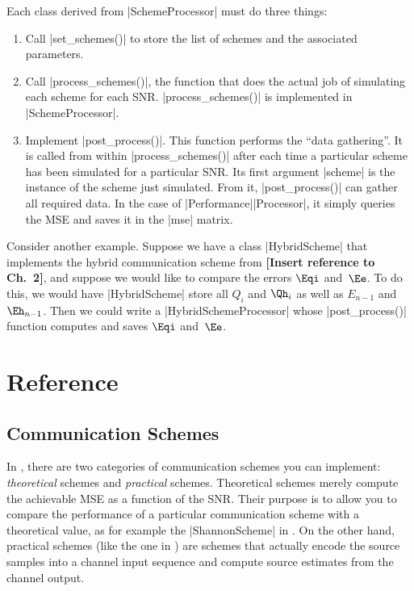 Each class derived from |SchemeProcessor| must do three things:
\begin{enumerate}
  \item Call |set_schemes()| to store the list of schemes and the associated
    parameters.

  \item Call |process_schemes()|, the function that does the actual job of
    simulating each scheme for each SNR. |process_schemes()| is implemented in
    |SchemeProcessor|. 

  \item Implement |post_process()|. This function performs the ``data
    gathering''. It is called from within |process_schemes()| after each time a
    particular scheme has been simulated for a particular SNR. Its first
    argument |scheme| is the instance of the scheme just simulated. From it,
    |post_process()| can gather all required data.  In the case of
    |Performance|\-|Processor|, it simply queries the MSE and saves it in the
    |mse| matrix.
\end{enumerate}


Consider another example. Suppose we have a class |HybridScheme| that implements
the hybrid communication scheme from \textbf{[Insert reference to Ch.~2]}, and
suppose we would like to compare the errors $\Eqi$ and~$\Ee$. To do this, we would have |HybridScheme| store all $Q_i$ and
$\Qh_i$ as well as $E_{n-1}$ and $\Eh_{n-1}$. Then we could write a
|HybridSchemeProcessor| whose |post_process()| function computes and saves
$\Eqi$ and~$\Ee$. 


\section{Reference}

\subsection{Communication Schemes}

In \jscsim, there are two categories of communication schemes you can implement:
\emph{theoretical} schemes and \emph{practical} schemes. Theoretical schemes
merely compute the achievable MSE as a function of the SNR. Their purpose is to
allow you to compare the performance of a particular communication scheme with a
theoretical value, as for example the |ShannonScheme| in . 
On the other hand, practical schemes (like the one in ) are
schemes that actually encode the source samples into a channel input sequence
and compute source estimates from the channel output. 

